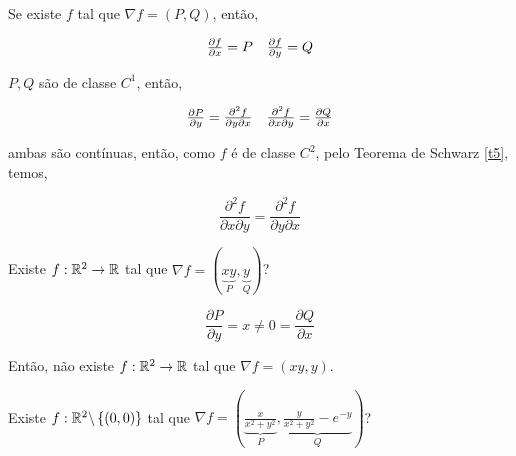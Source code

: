 \documentclass{book}
\begin{document}
\begin{dem}
Se existe $f$ tal que $\nabla f = \left( {P,Q} \right)$, ent\~ao,

\[
\begin{array}{*{20}c}
{\frac{{\partial f}}
{{\partial x}} = P} & {\frac{{\partial f}}
{{\partial y}} = Q}  \\

\end{array}
\]

$P,Q$ s\~ao de classe $C^1$, ent\~ao,

\[
\begin{array}{*{20}c}
{\frac{{\partial P}}
{{\partial y}} = \frac{{\partial ^2 f}}
{{\partial y\partial x}}} & {\frac{{\partial ^2 f}}
{{\partial x\partial y}} = \frac{{\partial Q}}
{{\partial x}}}  \\

\end{array}
\]

    ambas s\~ao cont\'inuas, ent\~ao, como $f$ \'e de classe $C^2$, pelo Teorema de Schwarz \ref{t5}, temos,

\[
\frac{{\partial ^2 f}}
{{\partial x\partial y}} = \frac{{\partial ^2 f}}
{{\partial y\partial x}}
\]

\end{dem}

\begin{ex}
    Existe $f:\mathbb{R}^2 \to \mathbb{R}$ tal que $\nabla f = \left( {\underbrace {xy}_P,\underbrace y_Q} \right)$?
\end{ex}

\begin{sol}
\[
\frac{{\partial P}}
{{\partial y}} = x \ne 0 = \frac{{\partial Q}}
{{\partial x}}
\]

    Ent\~ao, n\~ao existe $f:\mathbb{R}^2 \to \mathbb{R}$ tal que $\nabla f = \left( {xy,y} \right)$.
\end{sol}

\begin{ex}
    Existe $f:\mathbb{R}^2 \backslash \left\{ {\left( {0,0} \right)} \right\}$ tal que $\nabla f = \left( {\underbrace {\frac{x}
{{x^2  + y^2 }}}_P,\underbrace {\frac{y}
{{x^2  + y^2 }} - e^{ - y} }_Q} \right)$?
\end{ex}
\end{document}
